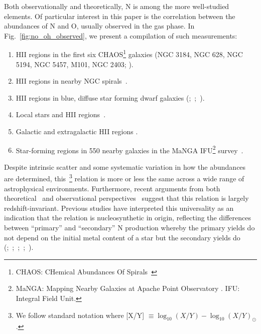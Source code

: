 \documentclass[ms.tex]{subfiles}
\begin{document}
Both observationally and theoretically, N is among the more well-studied
elements.
Of particular interest in this paper is the correlation between the abundances
of N and O, usually observed in the gas phase.
In Fig.~\ref{fig:no_oh_observed}, we present a compilation of such measurements:
\begin{enumerate}
	\item[\textbf{1.}] HII regions in the first six CHAOS\footnote{
		CHAOS: CHemical Abundances Of Spirals~\citep{Berg2015}
	} galaxies (NGC 3184, NGC 628, NGC 5194, NGC 5457, M101, NGC 2403;
	\citealp{Berg2020, Skillman2020, Rogers2021}).

	\item[\textbf{2.}] HII regions in nearby NGC spirals~\citep*{Pilyugin2010}.

	\item[\textbf{3.}] HII regions in blue, diffuse star forming dwarf galaxies
	(\citealp{Berg2012};~\citealp*{Izotov2012};~\citealp{James2015}).

	\item[\textbf{4.}] Local stars and HII regions~\citep{Dopita2016}.

	\item[\textbf{5.}] Galactic and extragalactic HII regions
	\citep*{Henry2000}.

	\item[\textbf{6.}] Star-forming regions in 550  nearby galaxies in the
	MaNGA IFU\footnote{
		MaNGA: Mapping Nearby Galaxies at Apache Point Observatory
		\citep{Bundy2015}.
		IFU: Integral Field Unit.
	} survey~\citep{Belfiore2017}.
\end{enumerate}
Despite intrinsic scatter and some systematic variation in how the abundances
are determined, this~\ohno\footnote{
	We follow standard notation where [X/Y]
	$\equiv \log_{10}(X/Y) - \log_{10}(X/Y)_\odot$.
} relation is more or less the same across a wide range of astrophysical
environments.
Furthermore, recent arguments from both theoretical~\citep{Vincenzo2018} and
observational perspectives~\citep{HaydenPawson2021} suggest that this relation
is largely redshift-invariant.
Previous studies have interpreted this universality as an indication that the
relation is nucleosynthetic in origin, reflecting the differences between
``primary'' and ``secondary'' N production whereby the primary yields do not
depend on the initial metal content of a star but the secondary yields do
(\citealp{VilaCostas1993};~\citealp*{vanZee1998};~\citealp{Henry1999,
PerezMontero2009, Berg2012};~\citealp*{Pilyugin2012};~\citealp{Andrews2013}).
\end{document}
